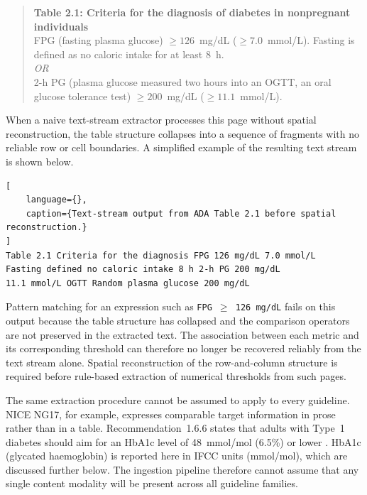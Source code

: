 \begin{quote}
\textnormal{\textbf{Table 2.1: Criteria for the diagnosis of diabetes in
nonpregnant individuals}}\\[4pt]

FPG (fasting plasma glucose) $\geq 126$~mg/dL
($\geq 7.0$~mmol/L). Fasting is defined as no caloric intake for at least
8~h.\\[2pt]

\textit{OR}\\[2pt]

2-h PG (plasma glucose measured two hours into an OGTT, an oral glucose
tolerance test) $\geq 200$~mg/dL ($\geq 11.1$~mmol/L).
\end{quote}

When a naive text-stream extractor processes this page without spatial
reconstruction, the table structure collapses into a sequence of fragments
with no reliable row or cell boundaries. A simplified example of the
resulting text stream is shown below.

\begin{lstlisting}[
    language={},
    caption={Text-stream output from ADA Table 2.1 before spatial reconstruction.}
]
Table 2.1 Criteria for the diagnosis FPG 126 mg/dL 7.0 mmol/L
Fasting defined no caloric intake 8 h 2-h PG 200 mg/dL
11.1 mmol/L OGTT Random plasma glucose 200 mg/dL
\end{lstlisting}

Pattern matching for an expression such as
\texttt{FPG $\geq$ 126 mg/dL} fails on this output because the table
structure has collapsed and the comparison operators are not preserved in
the extracted text. The association between each metric and its corresponding
threshold can therefore no longer be recovered reliably from the text stream
alone. Spatial reconstruction of the row-and-column structure is required
before rule-based extraction of numerical thresholds from such pages.

The same extraction procedure cannot be assumed to apply to every guideline.
NICE NG17, for example, expresses comparable target information in prose
rather than in a table. Recommendation~1.6.6 states that adults with Type~1
diabetes should aim for an HbA1c level of 48~mmol/mol (6.5\%) or lower
\cite[recommendation 1.6.6]{NICE_T1_2022}. HbA1c (glycated haemoglobin) is
reported here in IFCC units (mmol/mol), which are discussed further below.
The ingestion pipeline therefore cannot assume that any single content
modality will be present across all guideline families.


